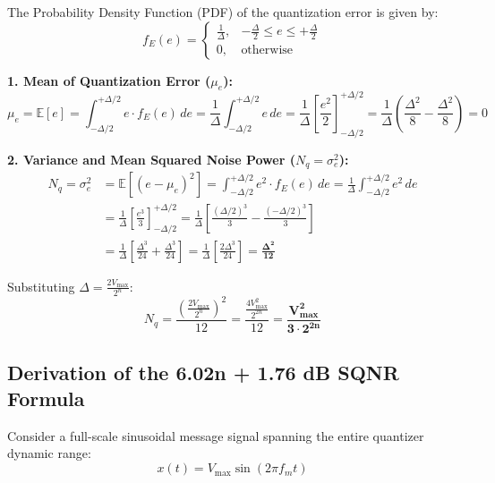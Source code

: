 \documentclass[11pt,a4paper]{article}
\begin{document}
The Probability Density Function (PDF) of the quantization error is given by:
\begin{equation}
f_E(e) = \begin{cases} \frac{1}{\Delta}, & -\frac{\Delta}{2} \le e \le +\frac{\Delta}{2} \\ 0, & \text{otherwise} \end{cases}
\end{equation}

\noindent\textbf{1. Mean of Quantization Error ($\mu_e$):}
\begin{equation}
\mu_e = \mathbb{E}[e] = \int_{-\Delta/2}^{+\Delta/2} e \cdot f_E(e) \, de = \frac{1}{\Delta} \int_{-\Delta/2}^{+\Delta/2} e \, de = \frac{1}{\Delta} \left[ \frac{e^2}{2} \right]_{-\Delta/2}^{+\Delta/2} = \frac{1}{\Delta} \left( \frac{\Delta^2}{8} - \frac{\Delta^2}{8} \right) = 0
\end{equation}

\noindent\textbf{2. Variance and Mean Squared Noise Power ($N_q = \sigma_e^2$):}
\begin{align}
N_q = \sigma_e^2 &= \mathbb{E}[(e - \mu_e)^2] = \int_{-\Delta/2}^{+\Delta/2} e^2 \cdot f_E(e) \, de = \frac{1}{\Delta} \int_{-\Delta/2}^{+\Delta/2} e^2 \, de \\
&= \frac{1}{\Delta} \left[ \frac{e^3}{3} \right]_{-\Delta/2}^{+\Delta/2} = \frac{1}{\Delta} \left[ \frac{(\Delta/2)^3}{3} - \frac{(-\Delta/2)^3}{3} \right] \\
&= \frac{1}{\Delta} \left[ \frac{\Delta^3}{24} + \frac{\Delta^3}{24} \right] = \frac{1}{\Delta} \left[ \frac{2\Delta^3}{24} \right] = \mathbf{\frac{\Delta^2}{12}}
\end{align}

Substituting $\Delta = \frac{2 V_{\max}}{2^n}$:
\begin{equation}
N_q = \frac{\left(\frac{2 V_{\max}}{2^n}\right)^2}{12} = \frac{\frac{4 V_{\max}^2}{2^{2n}}}{12} = \mathbf{\frac{V_{\max}^2}{3 \cdot 2^{2n}}}
\end{equation}

\subsection{Derivation of the 6.02n + 1.76 dB SQNR Formula}
Consider a full-scale sinusoidal message signal spanning the entire quantizer dynamic range:
\begin{equation}
x(t) = V_{\max} \sin(2\pi f_m t)
\end{equation}
\end{document}
